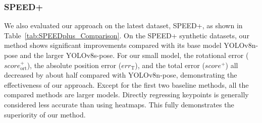 \documentclass[a4paper,fleqn]{cas-sc}
\begin{document}
\begin{table}[htbp]
    \centering
    \caption{Comparative Performance of 6D Spacecraft Pose Estimation Methods on the SPEED+ synthetic Dataset}
    \label{tab:SPEEDplus_Comparison}
\end{table}



\subsubsection{SPEED+}
We also evaluated our approach on the latest dataset, SPEED+, as shown in Table~\ref{tab:SPEEDplus_Comparison}.
On the SPEED+ synthetic datasets, our method shows significant improvements compared with its base model YOLOv8n-pose and the larger YOLOv8s-pose.
For our small model, the rotational error ($score_{\text{ort}}^+$), the absolute position error ($err_{\text{T}}$), and the total error ($score^+$) all decreased by about half compared with YOLOv8n-pose, demonstrating the effectiveness of our approach.
Except for the first two baseline methods, all the compared methods are larger models.
Directly regressing keypoints is generally considered less accurate than using heatmaps.
This fully demonstrates the superiority of our method.
\end{document}
